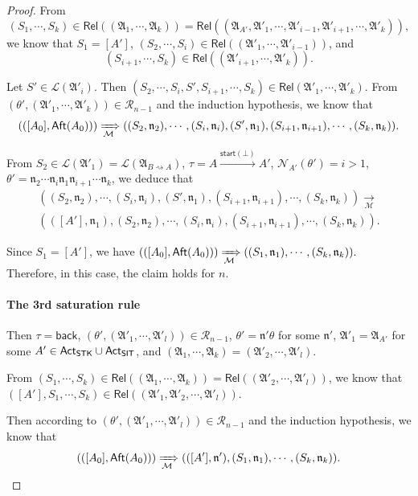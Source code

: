 \documentclass[preprint,12pt]{elsarticle}
\newcommand\Mm{{\mathcal{M} }}
\newcommand\act{{\sf Act}}
\newcommand\aft{{\sf Aft}}
\newcommand\singletask{{\sf STK}}
\newcommand\singleinstance{{\sf SIT}}
\newcommand\back{{\mathsf{back} }}
\newcommand\startactivity{{\mathsf{start} }}
\newcommand\namefun{\mathcal{N}}
\newcommand\aname{\mathfrak{n}}
\newcommand\AutReach{\mathscr{R}}
\newcommand\Rel{\mathsf{Rel}}
\newcommand\Aut{{\mathfrak{A} }}
\newcommand\Lang{{\mathscr{L} }}
\begin{document}
\begin{proof}
From 
%
$$(S_1, \cdots, S_k) \in \Rel((\Aut_1, \cdots, \Aut_k)) = \Rel((\Aut_{A'}, \Aut'_1, \cdots, \Aut'_{i-1}, \Aut'_{i+1}, \cdots, \Aut'_k)),$$ 
%
we know that $S_1 = [A']$, $(S_2, \cdots, S_i) \in \Rel((\Aut'_1, \cdots, \Aut'_{i-1}))$, and 
$$(S_{i+1}, \cdots, S_k) \in \Rel((\Aut'_{i+1}, \cdots, \Aut'_k)).$$

Let $S' \in \Lang(\Aut'_i)$. Then $(S_2, \cdots, S_i, S', S_{i+1}, \cdots, S_k) \in \Rel(\Aut'_1, \cdots, \Aut'_k)$.
From $(\theta', (\Aut'_1, \cdots, \Aut'_k)) \in \AutReach_{n-1}$ and the induction hypothesis, we know that  
%
$$(([A_0], \aft(A_0))) \xRightarrow[\Mm]{} ((S_2, \aname_2), \cdots, (S_i, \aname_i), (S', \aname_1), (S_{i+1}, \aname_{i+1}), \cdots, (S_k, \aname_k)).$$ 

From $S_2 \in \Lang(\Aut'_1) = \Lang(\Aut_{B\rightsquigarrow A})$,  $\tau = A \xrightarrow{\startactivity(\bot)} A'$, $\namefun_{A'}(\theta') = i > 1$, 
$\theta' = \aname_2  \cdots  \aname_{i} \aname_1  \aname_{i+1}  \cdots  \aname_k$, we deduce that 
$$
\begin{array}{l}
((S_2, \aname_2), \cdots, (S_i, \aname_i), (S', \aname_1), (S_{i+1}, \aname_{i+1}), \cdots, (S_k, \aname_k)) \xrightarrow[\Mm]{} \\
(([A'], \aname_1), (S_2, \aname_2), \cdots, (S_i, \aname_i), (S_{i+1}, \aname_{i+1}), \cdots, (S_k, \aname_k)).
\end{array}
$$ 

Since $S_1 = [A']$, we have
$(([A_0], \aft(A_0))) \xRightarrow[\Mm]{} ((S_1, \aname_1), \cdots, (S_k, \aname_k)).$
%
Therefore, in this case, the claim holds for $n$.


\paragraph*{The 3rd saturation rule} Then $\tau = \back$, $(\theta', (\Aut'_1, \cdots, \Aut'_l)) \in \AutReach_{n-1}$,  $\theta' = \aname' \theta$ for some $\aname'$, $\Aut'_1 = \Aut_{A'}$ for some $A' \in \act_\singletask\cup \act_\singleinstance$, and $(\Aut_1, \cdots, \Aut_k) = (\Aut'_2, \cdots, \Aut'_l)$.

From $(S_1, \cdots, S_k) \in \Rel((\Aut_1, \cdots, \Aut_k)) = \Rel((\Aut'_2, \cdots, \Aut'_l))$, we know that $([A'], S_1, \cdots, S_k) \in \Rel((\Aut'_1, \Aut'_2, \cdots, \Aut'_l))$. 

Then according to $(\theta', (\Aut'_1, \cdots, \Aut'_l)) \in \AutReach_{n-1}$ and the induction hypothesis, we know that 
$$(([A_0], \aft(A_0))) \xRightarrow[\Mm]{} (([A'], \aname'), (S_1, \aname_1), \cdots, (S_k, \aname_k)).$$ 


\end{proof}
\end{document}
